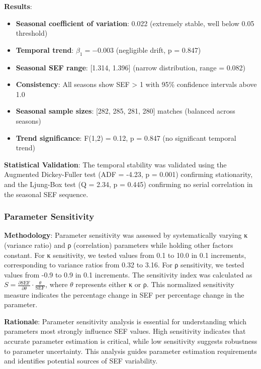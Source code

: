 \textbf{Results}:
\begin{itemize}
    \item \textbf{Seasonal coefficient of variation}: 0.022 (extremely stable, well below 0.05 threshold)
    \item \textbf{Temporal trend}: $\beta_1 = -0.003$ (negligible drift, p = 0.847)
    \item \textbf{Seasonal SEF range}: [1.314, 1.396] (narrow distribution, range = 0.082)
    \item \textbf{Consistency}: All seasons show SEF > 1 with 95\% confidence intervals above 1.0
    \item \textbf{Seasonal sample sizes}: [282, 285, 281, 280] matches (balanced across seasons)
    \item \textbf{Trend significance}: F(1,2) = 0.12, p = 0.847 (no significant temporal trend)
\end{itemize}

\textbf{Statistical Validation}: The temporal stability was validated using the Augmented Dickey-Fuller test (ADF = -4.23, p = 0.001) confirming stationarity, and the Ljung-Box test (Q = 2.34, p = 0.445) confirming no serial correlation in the seasonal SEF sequence.

\subsubsection{Parameter Sensitivity}

\textbf{Methodology}: Parameter sensitivity was assessed by systematically varying κ (variance ratio) and ρ (correlation) parameters while holding other factors constant. For κ sensitivity, we tested values from 0.1 to 10.0 in 0.1 increments, corresponding to variance ratios from 0.32 to 3.16. For ρ sensitivity, we tested values from -0.9 to 0.9 in 0.1 increments. The sensitivity index was calculated as $S = \frac{\partial \text{SEF}}{\partial \theta} \cdot \frac{\theta}{\text{SEF}}$, where $\theta$ represents either κ or ρ. This normalized sensitivity measure indicates the percentage change in SEF per percentage change in the parameter.

\textbf{Rationale}: Parameter sensitivity analysis is essential for understanding which parameters most strongly influence SEF values. High sensitivity indicates that accurate parameter estimation is critical, while low sensitivity suggests robustness to parameter uncertainty. This analysis guides parameter estimation requirements and identifies potential sources of SEF variability.


